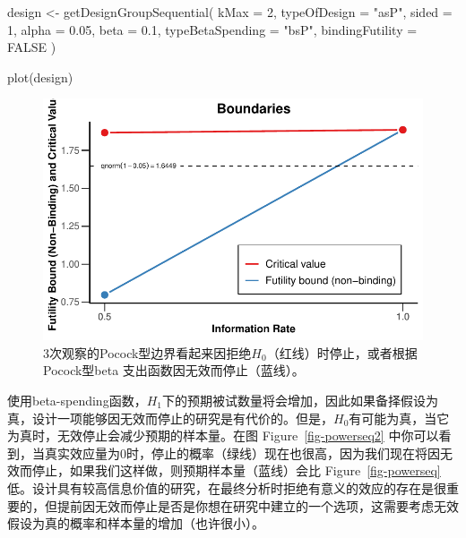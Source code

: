 \documentclass[
  letterpaper,
  DIV=11,
  numbers=noendperiod]{scrreprt}
\newenvironment{Shaded}{\begin{snugshade}}{\end{snugshade}}
\newcommand{\AttributeTok}[1]{\textcolor[rgb]{0.40,0.45,0.13}{#1}}
\newcommand{\ConstantTok}[1]{\textcolor[rgb]{0.56,0.35,0.01}{#1}}
\newcommand{\DecValTok}[1]{\textcolor[rgb]{0.68,0.00,0.00}{#1}}
\newcommand{\FloatTok}[1]{\textcolor[rgb]{0.68,0.00,0.00}{#1}}
\newcommand{\FunctionTok}[1]{\textcolor[rgb]{0.28,0.35,0.67}{#1}}
\newcommand{\NormalTok}[1]{\textcolor[rgb]{0.00,0.23,0.31}{#1}}
\newcommand{\OtherTok}[1]{\textcolor[rgb]{0.00,0.23,0.31}{#1}}
\newcommand{\StringTok}[1]{\textcolor[rgb]{0.13,0.47,0.30}{#1}}
\begin{document}
\begin{Shaded}
\begin{Highlighting}[]
\NormalTok{design }\OtherTok{\textless{}{-}} \FunctionTok{getDesignGroupSequential}\NormalTok{(}
  \AttributeTok{kMax =} \DecValTok{2}\NormalTok{,}
  \AttributeTok{typeOfDesign =} \StringTok{"asP"}\NormalTok{,}
  \AttributeTok{sided =} \DecValTok{1}\NormalTok{,}
  \AttributeTok{alpha =} \FloatTok{0.05}\NormalTok{,}
  \AttributeTok{beta =} \FloatTok{0.1}\NormalTok{,}
  \AttributeTok{typeBetaSpending =} \StringTok{"bsP"}\NormalTok{,}
  \AttributeTok{bindingFutility =} \ConstantTok{FALSE}
\NormalTok{  )}

\FunctionTok{plot}\NormalTok{(design)}
\end{Highlighting}
\end{Shaded}

\begin{figure}[H]

{\centering \includegraphics[width=1\textwidth,height=\textheight]{10-sequential_files/figure-pdf/fig-futility2-1.pdf}

}

\caption{\label{fig-futility2}3次观察的Pocock型边界看起来因拒绝\(H_0\)（红线）时停止，或者根据Pocock型beta
支出函数因无效而停止（蓝线）。}

\end{figure}

使用beta-spending函数，\(H_1\)下的预期被试数量将会增加，因此如果备择假设为真，设计一项能够因无效而停止的研究是有代价的。但是，\(H_0\)有可能为真，当它为真时，无效停止会减少预期的样本量。在图
Figure~\ref{fig-powerseq2}
中你可以看到，当真实效应量为0时，停止的概率（绿线）现在也很高，因为我们现在将因无效而停止，如果我们这样做，则预期样本量（蓝线）会比
Figure~\ref{fig-powerseq}
低。设计具有较高信息价值的研究，在最终分析时拒绝有意义的效应的存在是很重要的，但提前因无效而停止是否是你想在研究中建立的一个选项，这需要考虑无效假设为真的概率和样本量的增加（也许很小）。
\end{document}
